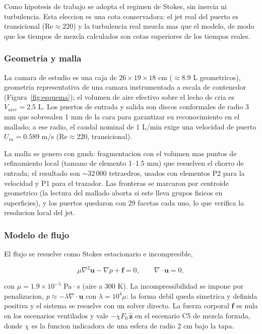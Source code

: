 Como hipotesis de trabajo se adopta el regimen de Stokes, sin inercia ni
turbulencia. Esta eleccion es una cota conservadora: el jet real del puerto
es transicional ($\mathrm{Re} \approx 220$) y la turbulencia real mezcla mas
que el modelo, de modo que los tiempos de mezcla calculados son cotas
superiores de los tiempos reales.

\subsubsection{Geometria y malla}

La camara de estudio es una caja de $26 \times 19 \times 18$ cm
($\approx 8.9$ L geometricos), geometria representativa de una
camara instrumentada a escala de contenedor
(Figura~\ref{fig:esquema}); el volumen de aire efectivo sobre el
lecho de cria es $V_{aire} = 2.5$ L. Los puertos de entrada y salida son discos conformales
de radio 3 mm que sobresalen 1 mm de la cara para garantizar su
reconocimiento en el mallado; a ese radio, el caudal nominal de 1 L/min
exige una velocidad de puerto $U_{in} = 0.589$ m/s ($\mathrm{Re} \approx 220$,
transicional).

La malla se genero con gmsh: fragmentacion con el volumen mas puntos de
refinamiento local (tamano de elemento 1--1.5 mm) que resuelven el chorro
de entrada; el resultado son $\sim 32\,000$ tetraedros, usados con
elementos P2 para la velocidad y P1 para el trazador. Las fronteras se
marcaron por centroide geometrico (la lectura del mallado aborta si este
lleva grupos fisicos en superficies), y los puertos quedaron con 29 facetas
cada uno, lo que verifica la resolucion local del jet.

\subsubsection{Modelo de flujo}

El flujo se resuelve como Stokes estacionario e incompresible,

\begin{equation}
  \mu \nabla^2 \mathbf{u} - \nabla p + \mathbf{f} = 0,
  \qquad \nabla\cdot\mathbf{u} = 0,
\end{equation}

con $\mu = 1.9\times10^{-5}$ Pa·s (aire a 300 K). La incompressibilidad se
impone por penalizacion, $p \approx -\lambda\nabla\cdot\mathbf{u}$ con
$\lambda = 10^4\mu$: la forma debil queda simetrica y definida positiva y
el sistema se resuelve con un solver directo. La fuerza corporal
$\mathbf{f}$ es nula en los escenarios ventilados y vale
$-\chi F_0\,\hat{\mathbf{z}}$ en el escenario C5 de mezcla forzada, donde
$\chi$ es la funcion indicadora de una esfera de radio 2 cm bajo la tapa.

